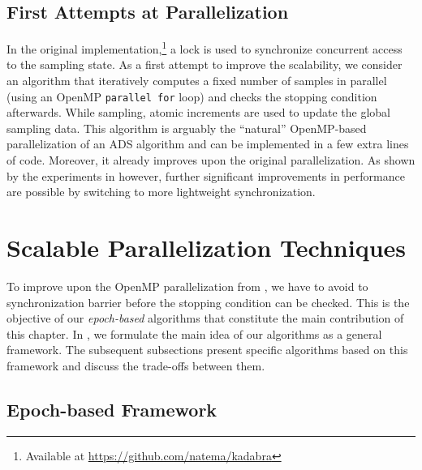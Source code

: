 \subsection{First Attempts at \kadabra Parallelization}
\label{sec:betw-apx:first-attempts}
%
In the original \kadabra implementation,\footnote{Available
at \url{https://github.com/natema/kadabra}} a lock is used
to synchronize concurrent access to the sampling state.
As a first attempt to improve the scalability, we consider an
algorithm that iteratively computes a fixed number of
samples in parallel (\eg using an OpenMP \texttt{parallel for}
loop) and checks the stopping condition afterwards.
%
While sampling, atomic increments are used to update the global
sampling data. This algorithm is arguably the \enquote{natural}
OpenMP-based parallelization of an ADS algorithm and can be
implemented in a few extra lines of code.
%
Moreover, it already improves upon the original parallelization.
As shown by the experiments in 
however, further significant improvements in performance
are possible by switching to more lightweight synchronization.

\section{Scalable Parallelization Techniques}
%
To improve upon the OpenMP parallelization from
, we have to avoid to synchronization barrier
before the stopping condition can be checked.
%
This is the objective of our \emph{epoch-based} algorithms that constitute the
main contribution of this chapter. In , we
formulate the main idea of our algorithms as a general framework. The
subsequent subsections present specific algorithms based on this framework and
discuss the trade-offs between them.

\subsection{Epoch-based Framework}
\label{sec:betw-apx:epoch-framework}

